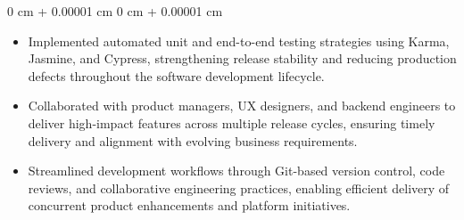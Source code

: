 \documentclass[10pt, letterpaper]{article}
\newenvironment{highlights}{
    \begin{itemize}[
        topsep=0.10 cm,
        parsep=0.10 cm,
        partopsep=0pt,
        itemsep=0pt,
        leftmargin=0 cm + 10pt
    ]
}{
    \end{itemize}
} %
\newenvironment{onecolentry}{
    \begin{adjustwidth}{
        0 cm + 0.00001 cm
    }{
        0 cm + 0.00001 cm
    }
}{
    \end{adjustwidth}
} %
\newenvironment{twocolentry}[2][]{
    \onecolentry
    \def\secondColumn{#2}
    \setcolumnwidth{\fill, 4.5 cm}
    \begin{paracol}{2}
}{
    \switchcolumn \raggedleft \secondColumn
    \end{paracol}
    \endonecolentry
} %
\begin{document}
\begin{onecolentry}
\begin{highlights}
                \item Implemented automated unit and end-to-end testing strategies using Karma, Jasmine, and Cypress, strengthening release stability and reducing production defects throughout the software development lifecycle.

                \item Collaborated with product managers, UX designers, and backend engineers to deliver high-impact features across multiple release cycles, ensuring timely delivery and alignment with evolving business requirements.

                \item Streamlined development workflows through Git-based version control, code reviews, and collaborative engineering practices, enabling efficient delivery of concurrent product enhancements and platform initiatives.
            \end{highlights}
        \end{onecolentry}

    

            

                


    
\end{document}
